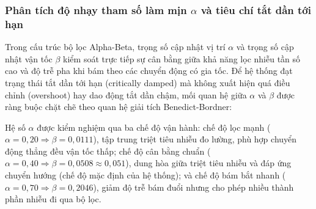 \subsubsection{Phân tích độ nhạy tham số làm mịn \texorpdfstring{$\alpha$}{alpha} và tiêu chí tắt dần tới hạn}

\hspace{0.5cm} Trong cấu trúc bộ lọc Alpha-Beta, trọng số cập nhật vị trí $\alpha$ và trọng số cập nhật vận tốc $\beta$ kiểm soát trực tiếp sự cân bằng giữa khả năng lọc nhiễu tần số cao và độ trễ pha khi bám theo các chuyển động có gia tốc. Để hệ thống đạt trạng thái tắt dần tới hạn (critically damped) mà không xuất hiện quá điều chỉnh (overshoot) hay dao động tắt dần chậm, mối quan hệ giữa $\alpha$ và $\beta$ được ràng buộc chặt chẽ theo quan hệ giải tích Benedict-Bordner:


Hệ số $\alpha$ được kiểm nghiệm qua ba chế độ vận hành: chế độ lọc mạnh ($\alpha = 0{,}20 \Rightarrow \beta = 0{,}0111$), tập trung triệt tiêu nhiễu đo lường, phù hợp chuyển động thẳng đều vận tốc thấp; chế độ cân bằng chuẩn ($\alpha = 0{,}40 \Rightarrow \beta = 0{,}0508 \approx 0{,}051$), dung hòa giữa triệt tiêu nhiễu và đáp ứng chuyển hướng (chế độ mặc định của hệ thống); và chế độ bám bắt nhanh ($\alpha = 0{,}70 \Rightarrow \beta = 0{,}2046$), giảm độ trễ bám đuổi nhưng cho phép nhiều thành phần nhiễu đi qua bộ lọc.

\begin{table}[H]
\centering
\caption{Độ nhạy của RMSE trung bình và độ lệch chuẩn theo tham số $\alpha$ (Người đi bộ, 10 seed)}
\label{tab:alpha-sweep-results}
\end{table}

